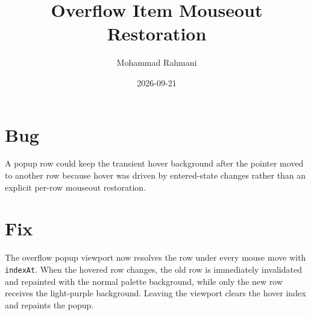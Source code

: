\documentclass[a4paper]{article}
\title{Overflow Item Mouseout Restoration}
\date{2026-09-21}
\author{Mohammad Rahmani}
\begin{document}
   \maketitle

   \begin{preview}
      \section{Bug}
      A popup row could keep the transient hover background after the pointer
      moved to another row because hover was driven by entered-state changes
      rather than an explicit per-row mouseout restoration.

      \section{Fix}
      The overflow popup viewport now resolves the row under every mouse move
      with \texttt{indexAt}. When the hovered row changes, the old row is
      immediately invalidated and repainted with the normal palette background,
      while only the new row receives the light-purple background. Leaving the
      viewport clears the hover index and repaints the popup.
   \end{preview}

   
   
\end{document}

